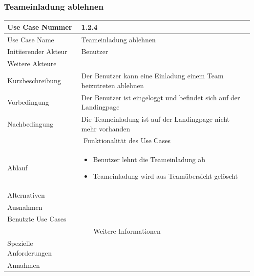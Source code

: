 \documentclass[10pt,a4paper]{article}
\begin{document}
		\subsubsection{Teameinladung ablehnen}
		\begin{tabular}{|l|p{.5\linewidth}|}
			\hline Use Case Nummer & 1.2.4 \\ 
			\hline Use Case Name & Teameinladung ablehnen \\ 
			\hline Initiierender Akteur & Benutzer \\
			\hline Weitere Akteure & \\
			\hline Kurzbeschreibung & Der Benutzer kann eine Einladung einem Team beizutreten ablehnen \\
			\hline Vorbedingung & Der Benutzer ist eingeloggt und befindet sich auf der Landingpage \\
			\hline Nachbedingung & Die Teameinladung ist auf der Landingpage nicht mehr vorhanden \\
			\hline \multicolumn{2}{|c|}{Funktionalität des Use Cases}\\
			\hline Ablauf & \begin{itemize}
				\item Benutzer lehnt die Teameinladung ab
				\item Teameinladung wird aus Teamübersicht gelöscht
			\end{itemize} \\
			\hline Alternativen & \\
			\hline Ausnahmen & \\
			\hline Benutzte Use Cases & \\
			\hline \multicolumn{2}{|c|}{Weitere Informationen} \\
			\hline Spezielle Anforderungen & \\
			\hline Annahmen & \\
			\hline
		\end{tabular}
				
\end{document}
